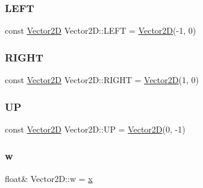 \hypertarget{class_vector2_d_a88282ec1acd645ccd8195c9c624c2607}{}\label{class_vector2_d_a88282ec1acd645ccd8195c9c624c2607} 
\subsubsection{\texorpdfstring{L\+E\+FT}{LEFT}}
{\footnotesize\ttfamily const \hyperlink{class_vector2_d}{Vector2D} Vector2\+D\+::\+L\+E\+FT = \hyperlink{class_vector2_d}{Vector2D}(-\/1, 0)\hspace{0.3cm}{\ttfamily [static]}}

\hypertarget{class_vector2_d_a066be8679c3ac8b38a42b3384aadf76f}{}\label{class_vector2_d_a066be8679c3ac8b38a42b3384aadf76f} 
\subsubsection{\texorpdfstring{R\+I\+G\+HT}{RIGHT}}
{\footnotesize\ttfamily const \hyperlink{class_vector2_d}{Vector2D} Vector2\+D\+::\+R\+I\+G\+HT = \hyperlink{class_vector2_d}{Vector2D}(1, 0)\hspace{0.3cm}{\ttfamily [static]}}

\hypertarget{class_vector2_d_abd688d20c24b9d6fca4378e3c65e37dc}{}\label{class_vector2_d_abd688d20c24b9d6fca4378e3c65e37dc} 
\subsubsection{\texorpdfstring{UP}{UP}}
{\footnotesize\ttfamily const \hyperlink{class_vector2_d}{Vector2D} Vector2\+D\+::\+UP = \hyperlink{class_vector2_d}{Vector2D}(0, -\/1)\hspace{0.3cm}{\ttfamily [static]}}

\hypertarget{class_vector2_d_a855db1822aebf50dd1521a1a550a30b8}{}\label{class_vector2_d_a855db1822aebf50dd1521a1a550a30b8} 
\subsubsection{\texorpdfstring{w}{w}}
{\footnotesize\ttfamily float\& Vector2\+D\+::w = \hyperlink{class_vector2_d_aeb4253ba6555251d010ea4450619029e}{x}}

\hypertarget{class_vector2_d_a849dfb5d61bc6500e259011f512188e3}{}\label{class_vector2_d_a849dfb5d61bc6500e259011f512188e3} 
